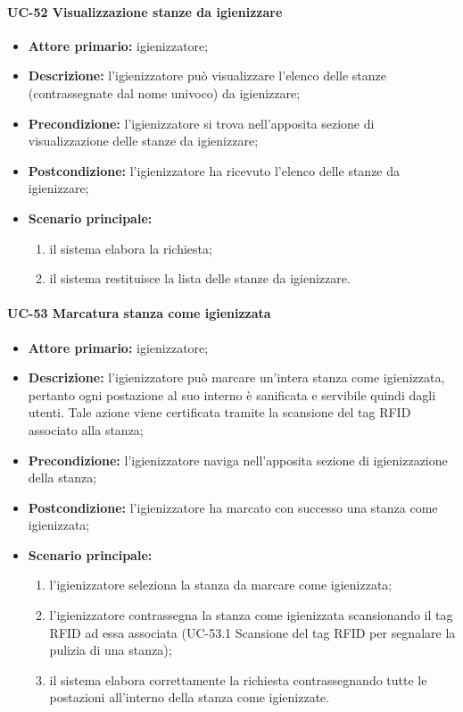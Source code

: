 \paragraph{UC-52 Visualizzazione stanze da igienizzare}
    \begin{itemize}
        \item \textbf{Attore primario:} igienizzatore;
        \item \textbf{Descrizione:} l’igienizzatore può visualizzare l'elenco delle stanze (contrassegnate dal nome univoco) da igienizzare;
        \item \textbf{Precondizione:} l'igienizzatore si trova nell’apposita sezione di visualizzazione delle stanze da igienizzare; 
        \item \textbf{Postcondizione:} l'igienizzatore ha ricevuto l'elenco delle stanze da igienizzare;
        \item \textbf{Scenario principale:} 
            \begin{enumerate}
                \item il sistema elabora la richiesta;
                \item il sistema restituisce la lista delle stanze da igienizzare.
            \end{enumerate}
    \end{itemize}
\paragraph{UC-53 Marcatura stanza come igienizzata}

    \begin{itemize}
        \item \textbf{Attore primario:} igienizzatore;
        \item \textbf{Descrizione:} l’igienizzatore può marcare un'intera stanza come igienizzata, pertanto ogni postazione al suo interno è sanificata e servibile quindi dagli utenti. Tale azione viene certificata tramite la scansione del tag RFID associato alla stanza;
        \item \textbf{Precondizione:} l'igienizzatore naviga nell’apposita sezione di igienizzazione della stanza; 
        \item \textbf{Postcondizione:} l'igienizzatore ha marcato con successo una stanza come igienizzata;
        \item \textbf{Scenario principale:} 
            \begin{enumerate}
                \item l'igienizzatore seleziona la stanza da marcare come igienizzata;	
                \item l'igienizzatore contrassegna la stanza come igienizzata scansionando il tag RFID ad essa associata (UC-53.1 Scansione del tag RFID per segnalare la pulizia di una stanza);
                \item il sistema elabora correttamente la richiesta contrassegnando tutte le postazioni all'interno della stanza come igienizzate.
            \end{enumerate}
    \end{itemize}

